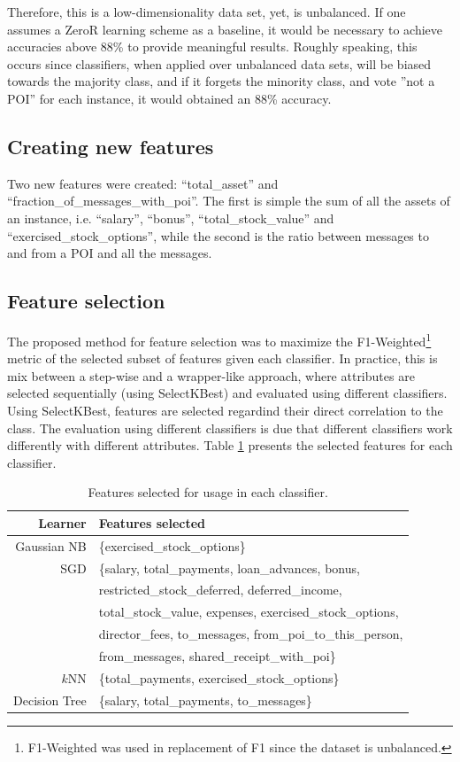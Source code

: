 \documentclass[11pt]{article}
\begin{document}
		Therefore, this is a low-dimensionality data set, yet, is unbalanced.
		If one assumes a ZeroR learning scheme as a baseline, it would be necessary to achieve accuracies above 88\% to provide meaningful results.
		Roughly speaking, this occurs since classifiers, when applied over unbalanced data sets, will be biased towards the majority class, and if it forgets the minority class, and vote ''not a POI'' for each instance, it would obtained an 88\% accuracy.
	
	
	\subsection{Creating new features}
		Two new features were created: ``total\_asset'' and ``fraction\_of\_messages\_with\_poi''.
		The first is simple the sum of all the assets of an instance, i.e. ``salary'', ``bonus'', ``total\_stock\_value'' and ``exercised\_stock\_options'', while the second is the ratio between messages to and from a POI and all the messages.
	
	
	\subsection{Feature selection}
		The proposed method for feature selection was to maximize the F1-Weighted\footnote{F1-Weighted was used in replacement of F1 since the dataset is unbalanced.} metric of the selected subset of features given each classifier.
		In practice, this is mix between a step-wise and a wrapper-like approach, where attributes are selected sequentially (using SelectKBest) and evaluated using different classifiers.
		Using SelectKBest, features are selected regardind their direct correlation to the class.
		The evaluation using different classifiers is due that different classifiers work differently with different attributes.
		Table \ref{tab:selectedFeatures} presents the selected features for each classifier.

		\begin{table}[!t]
			\centering
			\caption{Features selected for usage in each classifier.}
			\begin{tabular}{rl}
				\hline
				Learner & Features selected\\
				\hline
				Gaussian NB & \{exercised\_stock\_options\}\\
				SGD & \{salary, total\_payments, loan\_advances, bonus,\\
				~   & restricted\_stock\_deferred, deferred\_income,\\ 
				~   & total\_stock\_value, expenses, exercised\_stock\_options, \\
				~   & director\_fees, to\_messages, from\_poi\_to\_this\_person, \\
				~   & from\_messages, shared\_receipt\_with\_poi\}\\
				$k$NN & \{total\_payments, exercised\_stock\_options\}\\
				Decision Tree & \{salary, total\_payments, to\_messages\}\\
				\hline
			\end{tabular}
			\label{tab:selectedFeatures}
		\end{table}
		
\end{document}
